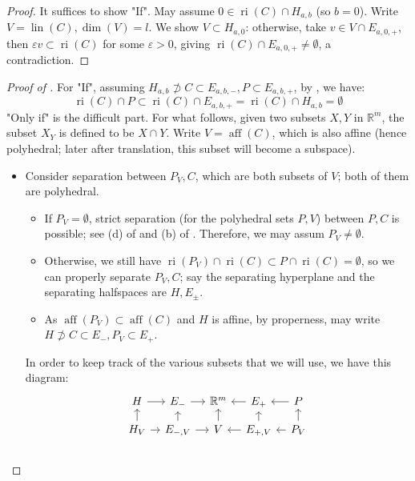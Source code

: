 \begin{proof}
	It suffices to show "If". May assume $0\in \operatorname{ri}(C)\cap H_{a,b}$ (so $b=0$). Write $V=\operatorname{lin}(C),\dim(V)=l$. We show $V\subset H_{a,0}$: otherwise, take $v\in V\cap E_{a,0,+}$, then $\varepsilon v\subset \operatorname{ri}(C)$ for some $\varepsilon >0$, giving $\operatorname{ri}(C)\cap E_{a,0,+}\neq\emptyset$, a contradiction.
\end{proof}

\begin{proof}[Proof of ]
	For "If", assuming $H_{a,b}\nsupset C\subset E_{a,b,-},P\subset E_{a,b,+}$, by , we have:
	\[
		\operatorname{ri}(C)\cap P\subset \operatorname{ri}(C)\cap E_{a,b,+}=\operatorname{ri}(C)\cap H_{a,b}=\emptyset
	\]
	"Only if" is the difficult part. For what follows, given two subsets $X,Y$ in $\mathbb{R}^m$, the subset $X_Y$ is defined to be $X\cap Y$. Write $V=\operatorname{aff}(C)$, which is also affine (hence polyhedral; later after translation, this subset will become a subspace).
	\begin{itemize}
		\item Consider separation between $P_V,C$, which are both subsets of $V$; both of them are polyhedral.
		      \begin{itemize}
			      \item If $P_V=\emptyset$, strict separation (for the polyhedral sets $P,V$) between $P,C$ is possible; see (d) of  and (b) of . Therefore, we may assum $P_V\neq\emptyset$.
			      \item Otherwise, we still have $\operatorname{ri}(P_V)\cap \operatorname{ri}(C)\subset P\cap \operatorname{ri}(C)=\emptyset$, so we can properly separate $P_V,C$; say the separating hyperplane and the separating halfspaces are $H,E_{\pm}$.
			      \item As $\operatorname{aff}(P_V)\subset\operatorname{aff}(C)$ and $H$ is affine, by properness, may write $H\nsupset C\subset  E_{-},P_V\subset E_+$.
		      \end{itemize}
		      In order to keep track of the various subsets that we will use, we have this diagram:
		      \[
			      \begin{tikzcd}[column sep=2ex,row sep=2ex]
				      H\rar{}&E_-\rar{}&\mathbb{R}^m&\lar{}E_+&\lar{}P\\
				      H_V\rar{}\uar{}&E_{-,V}\rar{}\uar{}&V\uar{}&\lar{}E_{+,V}\uar{}&\lar{}P_V\uar{}\\

\end{tikzcd}\]
\end{itemize}
\end{proof}
